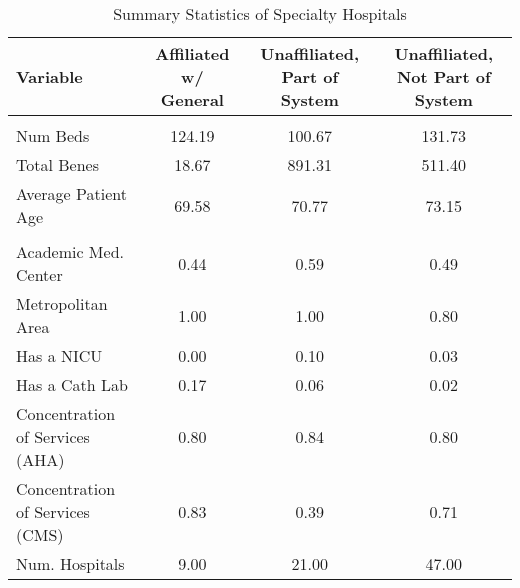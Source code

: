 \begin{table}[ht!]

\caption{Summary Statistics of Specialty Hospitals}
\centering
\begin{tabular}[t]{lccc}
\toprule
Variable & Affiliated w/ General & Unaffiliated, Part of System & Unaffiliated, Not Part of System\\
\midrule
\addlinespace[0.3em]
\multicolumn{4}{l}{\textbf{Characteristics}}\\
\hspace{1em}Num Beds & 124.19 & 100.67 & 131.73\\
\hspace{1em}Total Benes & 18.67 & 891.31 & 511.40\\
\hspace{1em}Average Patient Age & 69.58 & 70.77 & 73.15\\
\addlinespace[0.3em]
\multicolumn{4}{l}{\textbf{Services}}\\
\hspace{1em}Academic Med. Center & 0.44 & 0.59 & 0.49\\
\hspace{1em}Metropolitan Area & 1.00 & 1.00 & 0.80\\
\hspace{1em}Has a NICU & 0.00 & 0.10 & 0.03\\
Has a Cath Lab & 0.17 & 0.06 & 0.02\\
Concentration of Services (AHA) & 0.80 & 0.84 & 0.80\\
Concentration of Services (CMS) & 0.83 & 0.39 & 0.71\\
Num. Hospitals & 9.00 & 21.00 & 47.00\\
\bottomrule
\end{tabular}
\end{table}
